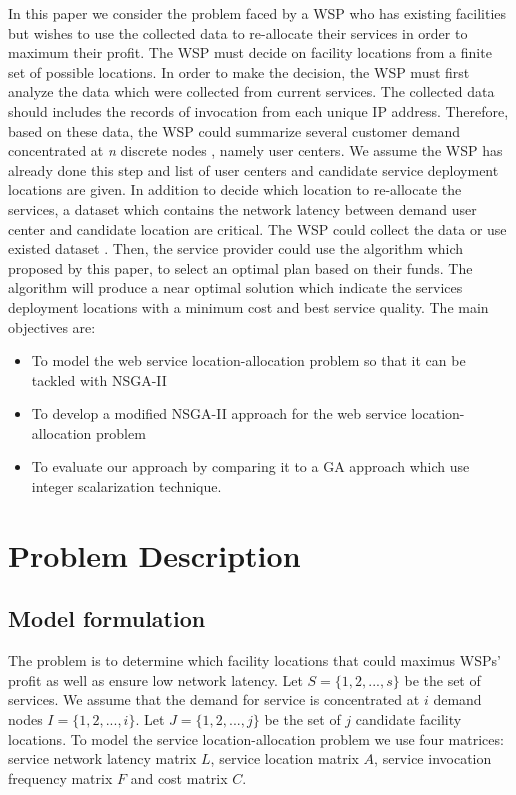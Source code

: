 \documentclass[twoside]{article}
\begin{document}
In this paper we consider the problem faced by a WSP who has existing facilities but wishes to use the collected data to re-allocate their services in order to maximum their profit.
The WSP must decide on facility locations from a finite set of possible locations. 
In order to make the decision, the WSP must first analyze the data which were collected from current services. 
The collected data should includes the records of invocation from each unique IP address.
Therefore, based on these data, the WSP could summarize several customer demand concentrated at \textit{n} discrete nodes \cite{Aboolian200964}, namely user centers. 
We assume the WSP has already done this step and list of user centers and candidate service deployment locations are given.
In addition to decide which location to re-allocate the services, a dataset which contains the network latency between demand user center and candidate location are critical. 
The WSP could collect the data or use existed dataset \cite{5552800, 6076756}. 
Then, the service provider could use the algorithm which proposed by this paper, to select an optimal plan based on their funds. 
The algorithm will produce a near optimal solution which indicate the services deployment locations with a minimum cost and best service quality.
The main objectives are:
\begin{itemize}
	\item To model the web service location-allocation problem so that it can be tackled with NSGA-II
	\item To develop a modified NSGA-II approach for the web service location-allocation problem
	\item To evaluate our approach by comparing it to a GA approach which use integer scalarization technique.
\end{itemize}











\section{Problem Description}
\subsection{Model formulation}
The problem is to determine which facility locations that could maximus WSPs’ profit 
as well as ensure low network latency. 
Let $S = \{ 1, 2, ..., s\}$ be the set of services. We assume that the demand for service is concentrated at $i$ 
demand nodes $I = \{ 1, 2, ..., i \}$. Let $J = \{ 1, 2, ..., j \}$ be the set of $j$ candidate facility locations.
To model the service location-allocation problem we use four matrices: service network latency matrix $L$, service location
matrix $A$, service invocation frequency matrix $F$ and cost matrix $C$.
\end{document}
